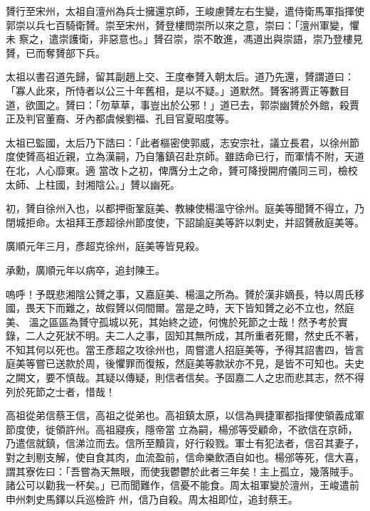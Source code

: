 \begin{pinyinscope}
 贇行至宋州，太祖自澶州為兵士擁還京師，王峻慮贇左右生變，遣侍衛馬軍指揮使郭崇以兵七百騎衛贇。崇至宋州，贇登樓問崇所以來之意，崇曰：「澶州軍變，懼未
 察之，遣崇護衛，非惡意也。」贇召崇，崇不敢進，馮道出與崇語，崇乃登樓見贇，已而奪贇部下兵。



 太祖以書召道先歸，留其副趙上交、王度奉贇入朝太后。道乃先還，贇謂道曰：「寡人此來，所恃者以公三十年舊相，是以不疑。」道默然。贇客將賈正等數目道，欲圖之。贇曰：「勿草草，事豈出於公邪！」道已去，郭崇幽贇於外館，殺賈正及判官董裔、牙內都虞候劉福、孔目官夏昭度等。



 太祖已監國，太后乃下誥曰：「此者樞密使郭威，志安宗社，議立長君，以徐州節度使贇高祖近親，立為漢嗣，乃自籓鎮召赴京師。雖誥命已行，而軍情不附，天道在北，人心靡東。適
 當改卜之初，俾膺分土之命，贇可降授開府儀同三司，檢校太師、上柱國，封湘陰公。」贇以幽死。



 初，贇自徐州入也，以都押衙鞏庭美、教練使楊溫守徐州。庭美等聞贇不得立，乃閉城拒命。太祖拜王彥超徐州節度使，下詔諭庭美等許以刺史，并詔贇赦庭美等。



 廣順元年三月，彥超克徐州，庭美等皆見殺。



 承勳，廣順元年以病卒，追封陳王。



 嗚呼！予既悲湘陰公贇之事，又嘉庭美、楊溫之所為。贇於漢非嫡長，特以周氏移國，畏天下而難之，故假贇以伺間爾。當是之時，天下皆知贇之必不立也，然庭美、
 溫之區區為贇守孤城以死，其始終之迹，何愧於死節之士哉！然予考於實錄，二人之死狀不明。夫二人之事，固知其無所成，其所重者死爾，然史氏不著，不知其何以死也。當王彥超之攻徐州也，周嘗遣人招庭美等，予得其詔書四，皆言庭美等嘗已送款於周，後懼罪而復叛，然庭美等款狀亦不見，是皆不可知也。夫史之闕文，要不慎哉。其疑以傳疑，則信者信矣。予固嘉二人之忠而悲其志，然不得列於死節之士者，惜哉！



 高祖從弟信蔡王信，高祖之從弟也。高祖鎮太原，以信為興捷軍都指揮使領義成軍節度使，徙領許州。高祖寢疾，隱帝當
 立為嗣，楊邠等受顧命，不欲信在京師，乃遣信就鎮，信涕泣而去。信所至黷貨，好行殺戮。軍士有犯法者，信召其妻子，對之刲剔支解，使自食其肉，血流盈前，信命樂飲酒自如也。楊邠等死，信大喜，謂其寮佐曰：「吾嘗為天無眼，而使我鬱鬱於此者三年矣！主上孤立，幾落賊手。諸公可以勸我一杯矣。」已而聞難作，信憂不能食。周太祖軍變於澶州，王峻遣前申州刺史馬鐸以兵巡檢許
 州，信乃自殺。周太祖即位，追封蔡王。



\end{pinyinscope}